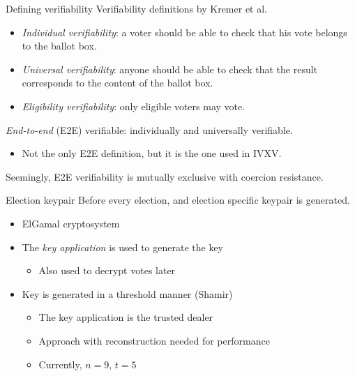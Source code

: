 \begin{frame}{Defining verifiability}
  Verifiability definitions by Kremer et al.
  \begin{itemize}[<+(1)->]
    \item \emph{Individual verifiability}: a voter should be able to check that his vote belongs to the ballot box.
    \item \emph{Universal verifiability}: anyone should be able to check that the result corresponds to the content of the ballot box.
    \item \emph{Eligibility verifiability}: only eligible voters may vote.
  \end{itemize}

  \pause
  \emph{End-to-end} (E2E) verifiable: individually and universally verifiable.
  \begin{itemize}
    \item Not the only E2E definition, but it is the one used in IVXV.
  \end{itemize}

  \pause
  Seemingly, E2E verifiability is mutually exclusive with coercion resistance.
\end{frame}

\begin{frame}{Election keypair}
  Before every election, and election specific keypair is generated.
  \begin{itemize}[<+(1)->]
    \item ElGamal cryptosystem
    \item The \emph{key application} is used to generate the key
    \par
    \begin{itemize}
      \item Also used to decrypt votes later
    \end{itemize}
    \item Key is generated in a threshold manner (Shamir)
    \par
    \begin{itemize}
      \item The key application is the trusted dealer
      \item Approach with reconstruction needed for performance
      \item Currently, $n = 9$, $t = 5$
    \end{itemize}
  \end{itemize}
\end{frame}

